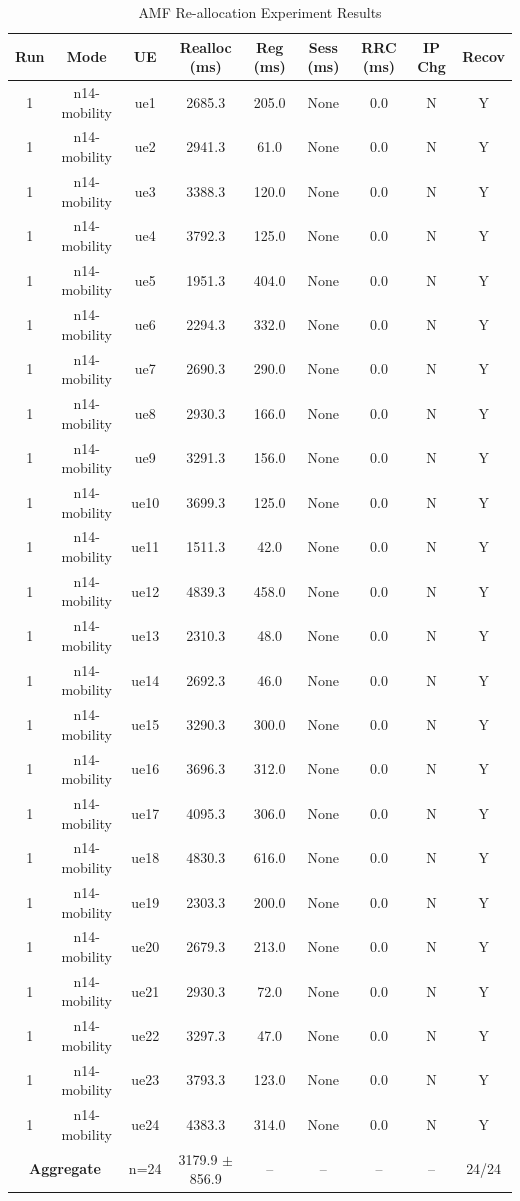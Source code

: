 \begin{table}[ht]
\centering
\begin{tabular}{|c|c|c|c|c|c|c|c|c|}
\hline
Run & Mode & UE & Realloc (ms) & Reg (ms) & Sess (ms) & RRC (ms) & IP Chg & Recov \\
\hline
1 & n14-mobility & ue1 & 2685.3 & 205.0 & None & 0.0 & N & Y \\
1 & n14-mobility & ue2 & 2941.3 & 61.0 & None & 0.0 & N & Y \\
1 & n14-mobility & ue3 & 3388.3 & 120.0 & None & 0.0 & N & Y \\
1 & n14-mobility & ue4 & 3792.3 & 125.0 & None & 0.0 & N & Y \\
1 & n14-mobility & ue5 & 1951.3 & 404.0 & None & 0.0 & N & Y \\
1 & n14-mobility & ue6 & 2294.3 & 332.0 & None & 0.0 & N & Y \\
1 & n14-mobility & ue7 & 2690.3 & 290.0 & None & 0.0 & N & Y \\
1 & n14-mobility & ue8 & 2930.3 & 166.0 & None & 0.0 & N & Y \\
1 & n14-mobility & ue9 & 3291.3 & 156.0 & None & 0.0 & N & Y \\
1 & n14-mobility & ue10 & 3699.3 & 125.0 & None & 0.0 & N & Y \\
1 & n14-mobility & ue11 & 1511.3 & 42.0 & None & 0.0 & N & Y \\
1 & n14-mobility & ue12 & 4839.3 & 458.0 & None & 0.0 & N & Y \\
1 & n14-mobility & ue13 & 2310.3 & 48.0 & None & 0.0 & N & Y \\
1 & n14-mobility & ue14 & 2692.3 & 46.0 & None & 0.0 & N & Y \\
1 & n14-mobility & ue15 & 3290.3 & 300.0 & None & 0.0 & N & Y \\
1 & n14-mobility & ue16 & 3696.3 & 312.0 & None & 0.0 & N & Y \\
1 & n14-mobility & ue17 & 4095.3 & 306.0 & None & 0.0 & N & Y \\
1 & n14-mobility & ue18 & 4830.3 & 616.0 & None & 0.0 & N & Y \\
1 & n14-mobility & ue19 & 2303.3 & 200.0 & None & 0.0 & N & Y \\
1 & n14-mobility & ue20 & 2679.3 & 213.0 & None & 0.0 & N & Y \\
1 & n14-mobility & ue21 & 2930.3 & 72.0 & None & 0.0 & N & Y \\
1 & n14-mobility & ue22 & 3297.3 & 47.0 & None & 0.0 & N & Y \\
1 & n14-mobility & ue23 & 3793.3 & 123.0 & None & 0.0 & N & Y \\
1 & n14-mobility & ue24 & 4383.3 & 314.0 & None & 0.0 & N & Y \\
\multicolumn{2}{|c|}{\textbf{Aggregate}} & n=24 & 3179.9 $\pm$ 856.9 & -- & -- & -- & -- & 24/24 \\
\hline
\end{tabular}
\caption{AMF Re-allocation Experiment Results}
\label{tab:amf_realloc}
\end{table}

